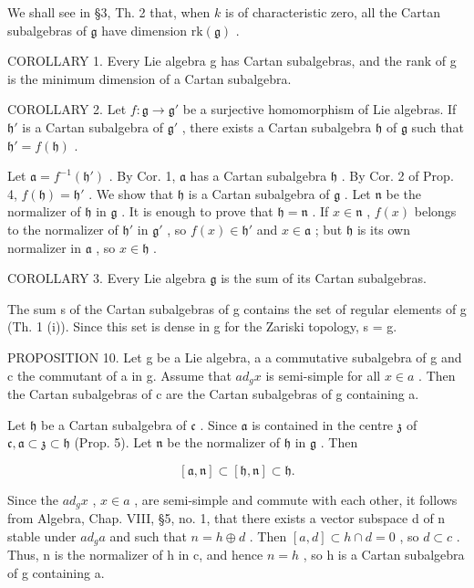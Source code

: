 We shall see in §3, Th. 2 that, when \(k\) is of characteristic zero, all the Cartan subalgebras of \(\mathfrak{g}\) have dimension \(\mathrm{rk}(\mathfrak{g})\) .

COROLLARY 1. Every Lie algebra g has Cartan subalgebras, and the rank of g is the minimum dimension of a Cartan subalgebra.

COROLLARY 2. Let \(f: \mathfrak{g} \to \mathfrak{g}'\) be a surjective homomorphism of Lie algebras. If \(\mathfrak{h}'\) is a Cartan subalgebra of \(\mathfrak{g}'\) , there exists a Cartan subalgebra \(\mathfrak{h}\) of \(\mathfrak{g}\) such that \(\mathfrak{h}' = f(\mathfrak{h})\) .

Let \(\mathfrak{a} = f^{-1}(\mathfrak{h}')\) . By Cor. 1, \(\mathfrak{a}\) has a Cartan subalgebra \(\mathfrak{h}\) . By Cor. 2 of Prop. 4, \(f(\mathfrak{h}) = \mathfrak{h}'\) . We show that \(\mathfrak{h}\) is a Cartan subalgebra of \(\mathfrak{g}\) . Let \(\mathfrak{n}\) be the normalizer of \(\mathfrak{h}\) in \(\mathfrak{g}\) . It is enough to prove that \(\mathfrak{h} = \mathfrak{n}\) . If \(x \in \mathfrak{n}\) , \(f(x)\) belongs to the normalizer of \(\mathfrak{h}'\) in \(\mathfrak{g}'\) , so \(f(x) \in \mathfrak{h}'\) and \(x \in \mathfrak{a}\) ; but \(\mathfrak{h}\) is its own normalizer in \(\mathfrak{a}\) , so \(x \in \mathfrak{h}\) .

COROLLARY 3. Every Lie algebra \(\mathfrak{g}\) is the sum of its Cartan subalgebras.

The sum s of the Cartan subalgebras of g contains the set of regular elements of g (Th. 1 (i)). Since this set is dense in g for the Zariski topology, s = g.

PROPOSITION 10. Let g be a Lie algebra, a a commutative subalgebra of g and c the commutant of a in g. Assume that \(ad_{g}x\) is semi-simple for all \(x \in a\) . Then the Cartan subalgebras of c are the Cartan subalgebras of g containing a.

Let \(\mathfrak{h}\) be a Cartan subalgebra of \(\mathfrak{c}\) . Since \(\mathfrak{a}\) is contained in the centre \(\mathfrak{z}\) of \(\mathfrak{c}, \mathfrak{a} \subset \mathfrak{z} \subset \mathfrak{h}\) (Prop. 5). Let \(\mathfrak{n}\) be the normalizer of \(\mathfrak{h}\) in \(\mathfrak{g}\) . Then

\[
[ \mathfrak {a}, \mathfrak {n} ] \subset [ \mathfrak {h}, \mathfrak {n} ] \subset \mathfrak {h}.
\]

Since the \(ad_{g}x\) , \(x \in a\) , are semi-simple and commute with each other, it follows from Algebra, Chap. VIII, §5, no. 1, that there exists a vector subspace d of n stable under \(ad_{g}a\) and such that \(n = h \oplus d\) . Then \([a, d] \subset h \cap d = 0\) , so \(d \subset c\) . Thus, n is the normalizer of h in c, and hence \(n = h\) , so h is a Cartan subalgebra of g containing a.

